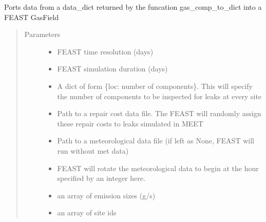 \documentclass[letterpaper,10pt,english]{sphinxmanual}
\begin{document}
\begin{fulllineitems}
\label{\detokenize{index:feast.MEET_1_importer.gc_dat_to_gas_field}}
Ports data from a data\_dict returned by the funcation gas\_comp\_to\_dict into a FEAST GasField
\begin{quote}\begin{description}
\item[{Parameters}] \leavevmode\begin{itemize}
\item {} 
 \textendash{} FEAST time resolution (days)

\item {} 
 \textendash{} FEAST simulation duration (days)

\item {} 
 \textendash{} A dict of form \{loc: number of components\}. This will specify the number of components to     be inspected for leaks at every site

\item {} 
 \textendash{} Path to a repair cost data file. The FEAST will randomly assign these repair costs to leaks     simulated in MEET

\item {} 
 \textendash{} Path to a meteorological data file (if left as None, FEAST will run without met data)

\item {} 
 \textendash{} FEAST will rotate the meteorological data to begin at the hour specified by an integer here.

\item {} 
 \textendash{} an array of emission sizes (g/s)

\item {} 
 \textendash{} an array of site ids


\end{itemize}
\end{description}
\end{quote}
\end{fulllineitems}
\end{document}
